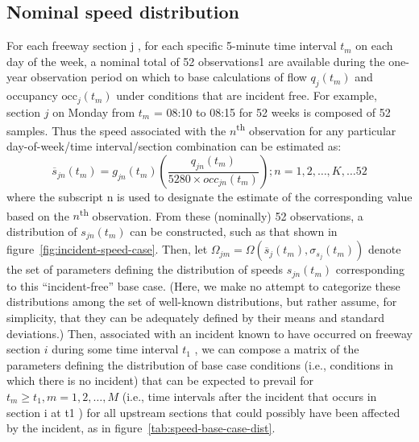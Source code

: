 \documentclass[12pt]{report}
\newcounter{time}
\begin{document}
\subsection{Nominal speed distribution}
\label{sec:nom-speed-dist}
For each freeway section j , for each specific 5-minute time interval
$t_m$ on each day of the week, a nominal total of 52 observations1 are
available during the one-year observation period on which to base
calculations of flow $q_j(t_m)$ and occupancy $\mathrm{occ}_j(t_m)$
under conditions that are incident free. For example, section $j$ on
Monday from $t_m$ = 08:10 to 08:15 for 52 weeks is composed of 52
samples. Thus the speed associated with the $n$\textsuperscript{th}
observation for any particular day-of-week/time interval/section
combination can be estimated as:
\begin{equation}
  \label{eq:nominal-speed-obs}
  \overline{s}_{jn}(t_m) = g_{jn}(t_m)\left(\frac{q_{jn}(t_m)}{5280\times occ_{jn}(t_m)}\right);n=1,2,\ldots,K,\ldots{52}
\end{equation}
where the subscript n is used to designate the estimate of the
corresponding value based on the $n$\textsuperscript{th}
observation. From these (nominally) 52 observations, a distribution of
$s_{jn}(t_m)$ can be constructed, such as that shown in
figure~\ref{fig:incident-speed-case}.  Then, let $\Omega_{jm} =
\Omega\left(\overline{s}_j(t_m),\sigma_{s_j}(t_m)\right)$ denote the
set of parameters defining the distribution of speeds $s_{jn}(t_m)$
corresponding to this ``incident-free'' base case. (Here, we make no
attempt to categorize these distributions among the set of well-known
distributions, but rather assume, for simplicity, that they can be
adequately defined by their means and standard deviations.)  Then,
associated with an incident known to have occurred on freeway section
$i$ during some time interval $t_1$ , we can compose a matrix of the
parameters defining the distribution of base case conditions (i.e.,
conditions in which there is no incident) that can be expected to
prevail for $t_m \ge t_1, m = 1, 2, \ldots{}, M$ (i.e., time intervals
after the incident that occurs in section i at t1 ) for all upstream
sections that could possibly have been affected by the incident, as in
figure~\ref{tab:speed-base-case-dist}.
\end{document}
